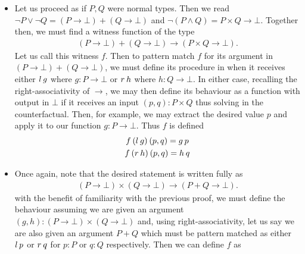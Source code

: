 \documentclass[11pt]{article}
\begin{document}
\begin{my proof}
\begin{itemize}
\item Let us proceed as if $P,Q$ were normal types. Then we read $\neg P \vee \neg Q = (P \to \bot) + (Q \to \bot)$ and $\neg (P \wedge Q) = P \times Q \to \bot$. Together then, we must find a witness function of the type \begin{align*}
(P \to \bot) + (Q \to \bot) \to (P \times Q \to \bot).
\end{align*}
Let us call this witness $f$. Then to pattern match $f$ for its argument in $(P \to \bot) + (Q \to \bot)$, we must define its procedure in when it receives either $l \hspace{0.2em} g$ where $g \colon P \to \bot$ or  $r \hspace{0.2em} h$ where $h \colon Q \to \bot$. In either case, recalling the right-associativity of $\to$, we may then define its behaviour as a function with output in $\bot$ if it receives an input $(p,q) \colon P \times Q$ thus solving in the counterfactual. Then, for example, we may extract the desired value $p$ and apply it to our function $g \colon P \to \bot$. Thus $f$ is defined \begin{gather*}
f \hspace{0.2em} (l \hspace{0.2em} g) \hspace{0.2em} (p,q) = g \hspace{0.2em} p \\
f \hspace{0.2em} (r \hspace{0.2em} h) \hspace{0.2em} (p,q) = h \hspace{0.2em} q
\end{gather*}
\item Once again, note that the desired statement is written fully as \begin{gather*}
(P \to \bot) \times (Q \to \bot) \to (P + Q \to \bot).
\end{gather*}
with the benefit of familiarity with the previous proof, we must define the behaviour assuming we are given an argument $(g,h) \colon (P \to \bot) \times (Q \to \bot)$ and, using right-associativity, let us say we are also given an argument $P + Q$ which must be pattern matched as either $l \hspace{0.2em} p$ or $r \hspace{0.2em} q$ for $p \colon P$ or $q \colon Q$ respectively. Then we can define $f$ as \begin{gather*}

\end{gather*}
\end{itemize}
\end{my proof}
\end{document}

